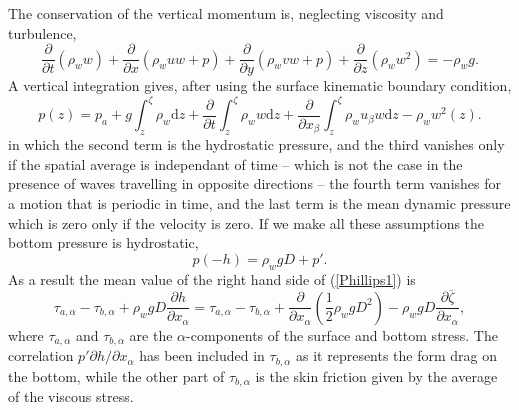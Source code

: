 The conservation of the vertical momentum is, neglecting viscosity and turbulence, 
\begin{equation}
 \frac{\partial }{\partial t} \left(\rho_w w\right)+ \frac{\partial }{\partial x} 
\left(\rho_w u w   + p  \right) + \frac{\partial }{\partial y} 
\left(\rho_w v w   + p  \right)+ \frac{\partial }{\partial z} \left(\rho_w w^2 \right)   = - \rho_w g.
\end{equation}
A vertical integration gives, after using the surface kinematic boundary condition, 
\begin{equation}
 p(z)=p_a + g\int_{z}^{\zeta} \rho_w \mathrm{d}z + \frac{\partial }{\partial t} \int_{z}^{\zeta} \rho_w w  \mathrm{d}z  
+ \frac{\partial }{\partial x_\beta} \int_{z}^{\zeta} \rho_w  u_\beta w  \mathrm{d}z
- \rho_w w^2(z).\label{p_z}
\end{equation}
in which the second term is the hydrostatic pressure, and the third
vanishes only if the spatial average is independant of time -- which is not the case in the presence of waves travelling in opposite directions  --  
the fourth term vanishes for a motion that is periodic in time, and the 
last term is the mean dynamic pressure which is zero only if the velocity is zero.  If we make all these assumptions 
the bottom pressure is hydrostatic, 
\begin{equation}
 p(-h)=\rho_w g D + p'.
\end{equation}
As a result the mean value of the right hand side of (\ref{Phillips1}) is 
\begin{equation}
\tau_{a,\alpha} - \tau_{b,\alpha} + \rho_w g D \frac{\partial h}{\partial x_\alpha}= \tau_{a,\alpha} - \tau_{b,\alpha} + \frac{\partial }{\partial x_\alpha}\left(\frac{1}{2} \rho_w g D^2 \right)
-\rho_w g D \frac{\partial \overline{\zeta}}{\partial x_\alpha},
\end{equation}
where $\tau_{a,\alpha}$  and $\tau_{b,\alpha}$ are the $\alpha$-components of the surface and bottom stress. 
The correlation $p' \partial h/ \partial x_\alpha$ has been included in $\tau_{b,\alpha}$ as it represents the form drag 
on the bottom, while the other part of $\tau_{b,\alpha}$ is the skin friction given by the average of the viscous stress. 

